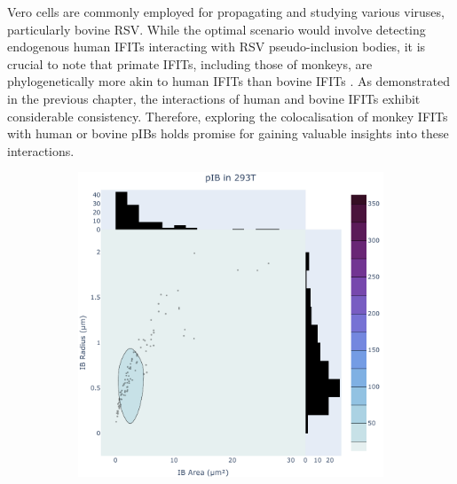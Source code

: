 Vero cells are commonly employed for propagating and studying various viruses, particularly bovine RSV. While the optimal scenario would involve detecting endogenous human IFITs interacting with RSV pseudo-inclusion bodies, it is crucial to note that primate IFITs, including those of monkeys, are phylogenetically more akin to human IFITs than bovine IFITs \cite{Zhou2013InterferonDefense.}. As demonstrated in the previous chapter, the interactions of human and bovine IFITs exhibit considerable consistency. Therefore, exploring the colocalisation of monkey IFITs with human or bovine pIBs holds promise for gaining valuable insights into these interactions.

\begin{figure}
    \begin{subfigure}{0.495\textwidth}
        \caption{}
        \includegraphics[width=\textwidth]{09. Chapter 4/Figs/01. pIB/01. pIB characterisation/01. heatmap_pib-293t.pdf} 
    \end{subfigure}
    \hfill
    \begin{subfigure}{0.495\textwidth}
        \caption{}

\end{subfigure}
\end{figure}

